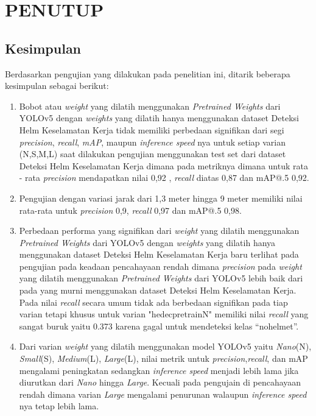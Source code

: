 \chapter{PENUTUP}
\label{chap:penutup}


\section{Kesimpulan}
\label{sec:kesimpulan}

\par Berdasarkan pengujian yang dilakukan pada penelitian ini, ditarik beberapa kesimpulan sebagai berikut:

\begin{enumerate}[nolistsep]
    \item Bobot atau \emph{weight} yang dilatih menggunakan \emph{Pretrained Weights} dari YOLOv5 dengan \emph{weights} yang dilatih hanya menggunakan dataset Deteksi Helm Keselamatan Kerja tidak memiliki perbedaan signifikan dari segi \emph{precision}, \emph{recall}, \emph{mAP}, maupun \emph{inference speed} nya untuk setiap varian (N,S,M,L) saat dilakukan pengujian menggunakan test set dari dataset Deteksi Helm Keselamatan Kerja dimana pada metriknya dimana untuk rata - rata \emph{precision} mendapatkan nilai 0,92 ,  \emph{recall} diatas 0,87 dan mAP@.5 0,92.
    \item Pengujian dengan variasi jarak dari 1,3 meter hingga 9 meter memiliki nilai rata-rata untuk \emph{precision} 0,9, \emph{recall} 0,97 dan mAP@.5 0,98.
    \item Perbedaan performa yang signifikan dari \emph{weight} yang dilatih menggunakan \emph{Pretrained Weights} dari YOLOv5 dengan \emph{weights} yang dilatih hanya menggunakan dataset Deteksi Helm Keselamatan Kerja baru terlihat pada pengujian pada keadaan pencahayaan rendah dimana \emph{precision} pada \emph{weight} yang dilatih menggunakan \emph{Pretrained Weights} dari YOLOv5 lebih baik dari pada yang murni menggunakan dataset Deteksi Helm Keselamatan Kerja. Pada nilai \emph{recall} secara umum tidak ada berbedaan signifikan pada tiap varian tetapi khusus untuk varian "hedec\textunderscore pretrain\textunderscore N" memiliki nilai \emph{recall} yang sangat buruk yaitu 0.373 karena gagal untuk mendeteksi kelas “no\textunderscore helmet”.
    \item Dari varian \emph{weight} yang dilatih menggunakan model YOLOv5 yaitu \emph{Nano}(N), \emph{Small}(S), \emph{Medium}(L), \emph{Large}(L), nilai metrik untuk \emph{precision},\emph{recall}, dan mAP mengalami peningkatan sedangkan \emph{inference speed} menjadi lebih lama jika diurutkan dari \emph{Nano} hingga \emph{Large}. Kecuali pada pengujain di pencahayaan rendah dimana varian \emph{Large} mengalami penurunan walaupun \emph{inference speed} nya tetap lebih lama.

\end{enumerate}
